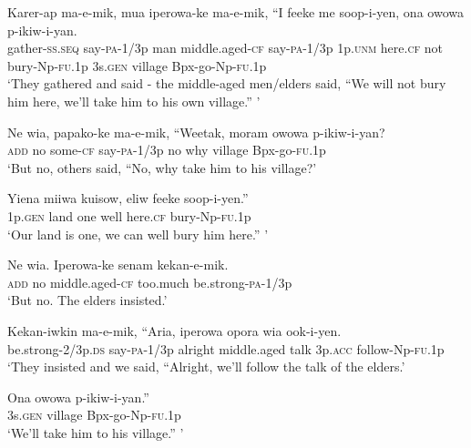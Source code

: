 \ea
\gll  Karer-ap  ma-e-mik,  mua  iperowa-ke  ma-e-mik,  “I             feeke  me  soop-i-yen,  ona  owowa  p-ikiw-i-yan. \\
gather-\textsc{ss.seq}  say-\textsc{pa}-1/3p  man  middle.aged-\textsc{cf}  say-\textsc{pa}-1/3p  1p.\textsc{unm}  here.\textsc{cf}  not  bury-Np-\textsc{fu}.1p  3s.\textsc{gen}  village  Bpx-go-Np-\textsc{fu}.1p \\


\glt ‘They gathered and said - the middle-aged men/elders said, “We will not bury him here, we’ll take him to his own village.” ’ \\
\z


\ea
\gll  Ne  wia,  papako-ke  ma-e-mik,  “Weetak,  moram  owowa  p-ikiw-i-yan? \\
\textsc{add}  no  some-\textsc{cf}  say-\textsc{pa}-1/3p  no  why  village  Bpx-go-\textsc{fu}.1p \\
\glt ‘But no, others said, “No, why take him to his village?’ \\
\z


\ea
\gll  Yiena  miiwa  kuisow,  eliw  feeke  soop-i-yen.” \\
1p.\textsc{gen}  land  one  well  here.\textsc{cf}  bury-Np-\textsc{fu}.1p \\
\glt ‘Our land is one, we can well bury him here.” ’ \\
\z


\ea
\gll  Ne  wia.  Iperowa-ke  senam  kekan-e-mik. \\
\textsc{add}  no  middle.aged-\textsc{cf}  too.much  be.strong-\textsc{pa}-1/3p \\
\glt ‘But no. The elders insisted.’ \\
\z


\ea
\gll  Kekan-iwkin  ma-e-mik,  “Aria,  iperowa  opora  wia            ook-i-yen. \\
be.strong-2/3p.\textsc{ds}  say-\textsc{pa}-1/3p  alright  middle.aged  talk  3p.\textsc{acc}   follow-Np-\textsc{fu}.1p \\


\glt ‘They insisted and we said, “Alright, we’ll follow the talk of the elders.’ \\
\z


\ea
\gll  Ona  owowa  p-ikiw-i-yan.” \\
3s.\textsc{gen}  village  Bpx-go-Np-\textsc{fu}.1p \\
\glt ‘We’ll take him to his village.” ’ \\
\z


